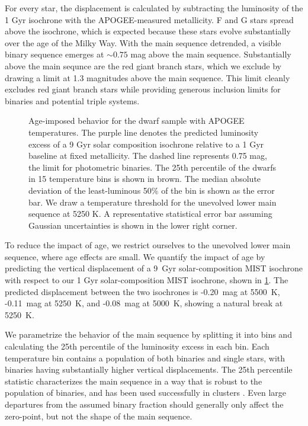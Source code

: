 \documentclass[twocolumn]{aastex6}
\begin{document}
For every star, the displacement is calculated by subtracting the luminosity 
of the 1 Gyr isochrone with the APOGEE-measured 
metallicity. F and G stars spread above the isochrone, which is 
expected because these stars evolve substantially over the age of the Milky
Way. With the main sequence detrended, a visible binary sequence emerges at 
\(\sim0.75\) mag above the main sequence. Substantially above the main sequnce
are the red giant branch stars, which we exclude by drawing a limit at 1.3 
magnitudes above the main sequence. This limit cleanly excludes red giant 
branch stars while providing generous inclusion limits for binaries and 
potential triple systems.

\begin{figure}[htb]
    \centering
    \caption{Age-imposed behavior for the dwarf sample with APOGEE
        temperatures. The purple line denotes the predicted luminosity excess of 
        a 9 Gyr solar composition isochrone relative to a 1 Gyr baseline at
        fixed metallicity. The dashed line represents 0.75 
        mag, the limit for photometric binaries. The 25th percentile of the 
        dwarfs in 15 temperature bins is shown in brown. The median absolute 
        deviation of the least-luminous 50\% of the bin is shown as the error 
        bar. We draw a temperature threshold for the unevolved lower main 
        sequence at 5250 K. A representative statistical error bar assuming 
        Gaussian uncertainties is shown in the lower right corner.}
    \label{fig:ages}
\end{figure}

To reduce the impact of age,
we restrict ourselves to the unevolved lower main sequence, where age
effects are small. We quantify the impact of age by predicting the vertical
displacement of a 9~Gyr solar-composition MIST isochrone with respect to our 
1 Gyr solar-composition MIST isochrone, shown in \cref{fig:ages}. The
predicted displacement between the two isochrones is -0.20~mag at 5500~K, 
-0.11~mag at 5250~K, and -0.08~mag at 5000~K, showing a natural break at 
5250~K.

We parametrize the behavior of the main sequence by splitting it into bins
and calculating the 25th percentile of the luminosity excess in each bin. Each 
temperature bin contains a population of both binaries and single stars, with 
binaries having substantially higher vertical displacements. The 25th 
percentile statistic characterizes the main sequence in a way that is robust 
to the population of binaries, and has been used successfully in clusters 
\citep{An06}. Even large departures from the assumed binary fraction should 
generally only affect the zero-point, but not the shape of the main sequence.
\end{document}

